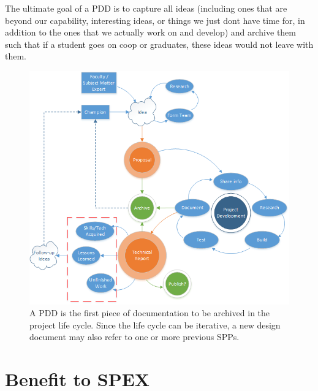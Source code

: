 \documentclass[conference]{IEEEtran} %
\begin{document}
The ultimate goal of a PDD is to capture all ideas (including ones that are beyond our capability, interesting ideas, or things we just dont have time for, in addition to the ones that we actually work on and develop) and archive them such that if a student goes on coop or graduates, these ideas would not leave with them.

\begin{figure}
  \includegraphics[width=\linewidth]{figs/project-life-cycle.png}
  \caption{A PDD is the first piece of documentation to be archived in the project life cycle. Since the life cycle can be iterative, a new design document may also refer to one or more previous SPPs.}
\label{fig:lifecycle}
\end{figure}


\section{Benefit to SPEX}
\label{sec:benefit}
\end{document}
